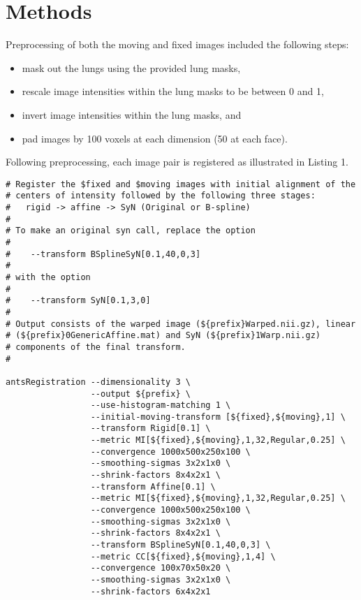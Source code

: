 \documentclass{llncs}
\begin{document}
\section{Methods}
Preprocessing of both the moving and fixed images included the following steps:
\begin{itemize}
  \item mask out the lungs using the provided lung masks,
  \item rescale image intensities within the lung masks to be between 0 and 1,
  \item invert image intensities within the lung masks, and
  \item pad images by 100 voxels at each dimension (50 at each face).
\end{itemize}
Following preprocessing, each image pair is registered as illustrated in 
Listing 1.
\vspace{2mm}
\begin{lstlisting}
# Register the $fixed and $moving images with initial alignment of the 
# centers of intensity followed by the following three stages:
#   rigid -> affine -> SyN (Original or B-spline)
#
# To make an original syn call, replace the option 
#
#    --transform BSplineSyN[0.1,40,0,3]
#
# with the option
#
#    --transform SyN[0.1,3,0]
#
# Output consists of the warped image (${prefix}Warped.nii.gz), linear
# (${prefix}0GenericAffine.mat) and SyN (${prefix}1Warp.nii.gz) 
# components of the final transform.
#

antsRegistration --dimensionality 3 \
                 --output ${prefix} \
                 --use-histogram-matching 1 \
                 --initial-moving-transform [${fixed},${moving},1] \
                 --transform Rigid[0.1] \
                 --metric MI[${fixed},${moving},1,32,Regular,0.25] \ 
                 --convergence 1000x500x250x100 \
                 --smoothing-sigmas 3x2x1x0 \
                 --shrink-factors 8x4x2x1 \
                 --transform Affine[0.1] \
                 --metric MI[${fixed},${moving},1,32,Regular,0.25] \ 
                 --convergence 1000x500x250x100 \
                 --smoothing-sigmas 3x2x1x0 \
                 --shrink-factors 8x4x2x1 \
                 --transform BSplineSyN[0.1,40,0,3] \
                 --metric CC[${fixed},${moving},1,4] \ 
                 --convergence 100x70x50x20 \
                 --smoothing-sigmas 3x2x1x0 \
                 --shrink-factors 6x4x2x1
\end{lstlisting}
\end{document}
